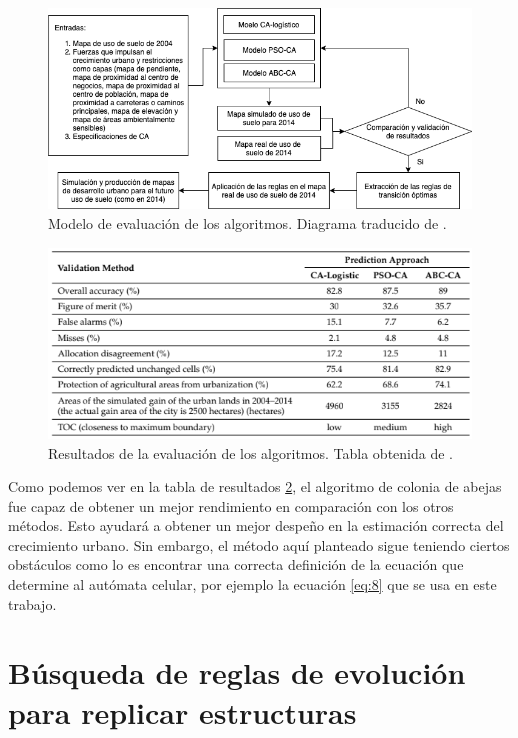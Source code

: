 \begin{figure}[H]
	\centering
	\includegraphics[width=\linewidth]{fig/evaluacion}
	\caption{Modelo de evaluación de los algoritmos. Diagrama traducido de \cite{naghibi2016discovery}.}
	\label{fig:evaluation}
\end{figure}

\begin{figure}[H]
	\centering
	\includegraphics[width=\linewidth]{fig/results}
	\caption{Resultados de la evaluación de los algoritmos. Tabla obtenida de \cite{naghibi2016discovery}. }
	\label{fig:results}
\end{figure}

Como podemos ver en la tabla de resultados \ref{fig:results}, el algoritmo de colonia de abejas fue capaz de obtener un mejor rendimiento en comparación con los otros métodos. Esto ayudará a obtener un mejor despeño en la estimación correcta del crecimiento urbano. Sin embargo, el método aquí planteado sigue teniendo ciertos obstáculos como lo es encontrar una correcta definición de la ecuación que determine al autómata celular, por ejemplo la ecuación \ref{eq:8} que se usa en este trabajo.

\section{Búsqueda de reglas de evolución para replicar estructuras}

